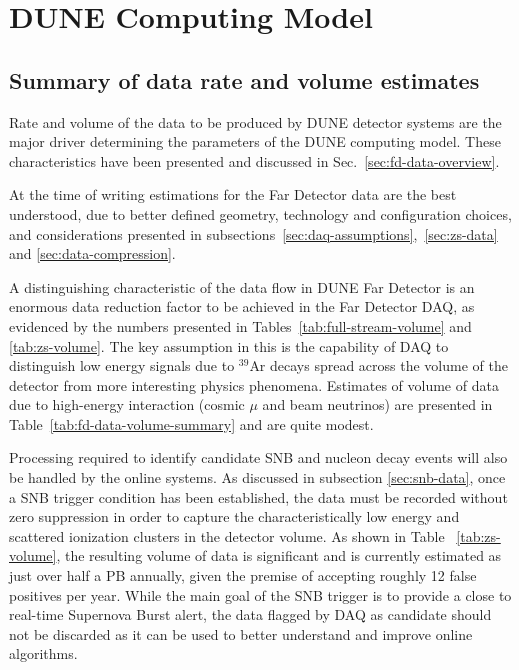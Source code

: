 \section{DUNE Computing Model}
\label{sec:computing_model}

\subsection{Summary of data rate and volume estimates}
Rate and volume of the data to be produced by DUNE detector systems are the major driver determining the parameters
of the DUNE computing model. These characteristics  have been presented and discussed in Sec.~\ref{sec:fd-data-overview}.

At the time of writing estimations for the Far Detector data are the best understood, due to better defined geometry,
technology and configuration choices, and considerations presented in subsections~\ref{sec:daq-assumptions},~\ref{sec:zs-data}
and \ref{sec:data-compression}.

A distinguishing characteristic of the data flow in DUNE Far Detector is an enormous data reduction factor to be achieved
in the Far Detector DAQ, as evidenced by the numbers presented in Tables~\ref{tab:full-stream-volume} and \ref{tab:zs-volume}.
The key assumption in this is the capability of DAQ to distinguish low energy signals  due to $^{39}$Ar decays spread
across the volume of the detector from more interesting physics phenomena. Estimates of volume of data due to
high-energy interaction (cosmic $\mu$ and beam neutrinos) are presented in Table~\ref{tab:fd-data-volume-summary}
and are quite modest.

Processing required to identify candidate SNB and nucleon decay events will also be handled by the online systems.
As discussed in subsection \ref{sec:snb-data}, once a SNB trigger condition has been established, the data must
be recorded without zero suppression in order to capture the characteristically low energy and scattered ionization
clusters in the detector volume. As shown in Table~ \ref{tab:zs-volume}, the resulting volume of data is significant
and is currently estimated as just over half a PB annually, given the premise of accepting roughly 12 false positives per year.
While the main goal of the SNB trigger is to provide a close to real-time Supernova Burst alert, the data flagged by DAQ
as candidate should not be discarded as it can be used to better understand and improve online algorithms.


